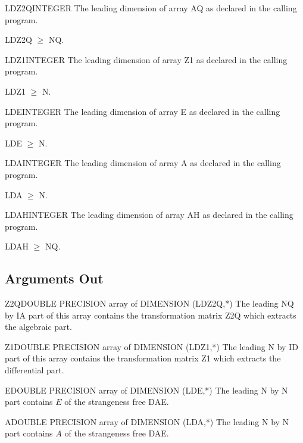 \begin{entry}{LDZ2Q}{INTEGER}
  The leading dimension of array AQ as declared in the calling program.

  LDZ2Q $\ge$ NQ.
\end{entry}

\begin{entry}{LDZ1}{INTEGER}
  The leading dimension of array Z1 as declared in the calling program.

  LDZ1 $\ge$ N.
\end{entry}

\begin{entry}{LDE}{INTEGER}
  The leading dimension of array E as declared in the calling program.

  LDE $\ge$ N.
\end{entry}

\begin{entry}{LDA}{INTEGER}
  The leading dimension of array A as declared in the calling program.

  LDA $\ge$ N.
\end{entry}

\begin{entry}{LDAH}{INTEGER}
  The leading dimension of array AH as declared in the calling program.

  LDAH $\ge$ NQ.
\end{entry}

\subsection{Arguments Out}

\begin{entry}{Z2Q}{DOUBLE PRECISION array of DIMENSION (LDZ2Q,*)}
  The leading NQ by IA part of this array contains the
  transformation matrix Z2Q which extracts the algebraic part. 
\end{entry}

\begin{entry}{Z1}{DOUBLE PRECISION array of DIMENSION (LDZ1,*)}
  The leading N by ID part of this array contains the
  transformation matrix Z1 which extracts the differential part. 
\end{entry}

\begin{entry}{E}{DOUBLE PRECISION array of DIMENSION (LDE,*)}
  The leading N by N part contains $E$ of the strangeness free DAE. 
\end{entry}

\begin{entry}{A}{DOUBLE PRECISION array of DIMENSION (LDA,*)}
  The leading N by N part contains $A$ of the strangeness free DAE. 
\end{entry}

